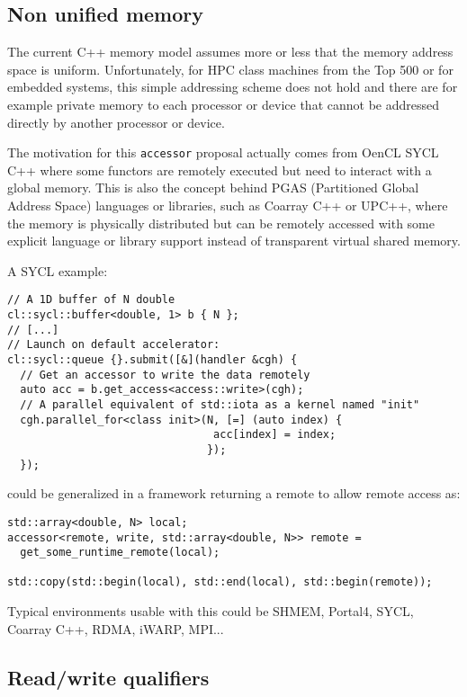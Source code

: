 \documentclass[a4paper]{article}
\begin{document}
\subsection{Non unified memory}
\label{sec:non-unified-memory}

The current C++ memory model assumes more or less that the memory
address space is uniform. Unfortunately, for HPC class machines from
the Top 500 or for embedded systems, this simple addressing scheme
does not hold and there are for example private memory to each
processor or device that cannot be addressed directly by another
processor or device.

The motivation for this \lstinline|accessor| proposal actually comes
from OenCL SYCL C++ where some functors are remotely executed but need
to interact with a global memory. This is also the concept behind PGAS
(Partitioned Global Address Space) languages or libraries, such as
Coarray C++ or UPC++, where the memory is physically distributed but
can be remotely accessed with some explicit language or library
support instead of transparent virtual shared memory.

A SYCL example:
\begin{lstlisting}
// A 1D buffer of N double
cl::sycl::buffer<double, 1> b { N };
// [...]
// Launch on default accelerator:
cl::sycl::queue {}.submit([&](handler &cgh) {
  // Get an accessor to write the data remotely
  auto acc = b.get_access<access::write>(cgh);
  // A parallel equivalent of std::iota as a kernel named "init"
  cgh.parallel_for<class init>(N, [=] (auto index) {
                                acc[index] = index;
                               });
  });
\end{lstlisting}

could be generalized in a framework returning a remote to allow remote
access as:
\begin{lstlisting}
std::array<double, N> local;
accessor<remote, write, std::array<double, N>> remote =
  get_some_runtime_remote(local);

std::copy(std::begin(local), std::end(local), std::begin(remote));
\end{lstlisting}

Typical environments usable with this could be SHMEM, Portal4, SYCL,
Coarray C++, RDMA, iWARP, MPI...


\subsection{Read/write qualifiers}
\label{sec:readwrite-qualifiers}
\end{document}
